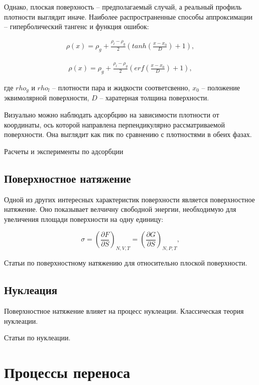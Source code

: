 Однако, плоская поверхность \--- предполагаемый случай, а реальный профиль плотности выглядит иначе. Наиболее распространенные способы аппроксимации \--- гиперболический тангенс и функция ошибок:

\begin{align}
\rho(x) = \rho_g + \frac{\rho_l-\rho_g}{2}(tanh(\frac{x-x_0}{D})+1),
\end{align}

\begin{align}
\rho(x) = \rho_g + \frac{\rho_l-\rho_g}{2}(erf(\frac{x-x_0}{D})+1),
\end{align}

где $rho_g$ и $rho_l$ \--- плотности пара и жидкости соответсвенно, $x_0$ \--- положение эквимолярной поверхности, $D$ \--- харатерная толщина поверхности.

Визуально можно наблюдать адсорбцию на зависимости плотности от координаты, ось которой направлена перпендикулярно рассматриваемой поверхности. Она выглядит как пик по сравнению с плотностями в обеих фазах. 

Расчеты и эксперименты по адсорбции

\subsection{Поверхностное натяжение}

Одной из других интересных характеристик поверхности является поверхностное натяжение. Оно показывает велчичну свободной энергии, необходимую для увеличения площади поверхности на одну единицу:

\begin{equation}
    \sigma = (\frac{\partial F}{\partial S})_{N, V, T} = (\frac{\partial G}{\partial S})_{N, P, T},
\end{equation}

Статьи по поверхностному натяжению для относительно плоской поверхности.

\subsection{Нуклеация}

Поверхностное натяжение влияет на процесс нуклеации. Классическая теория нуклеации.

Статьи по нуклеации.


\section{Процессы переноса}